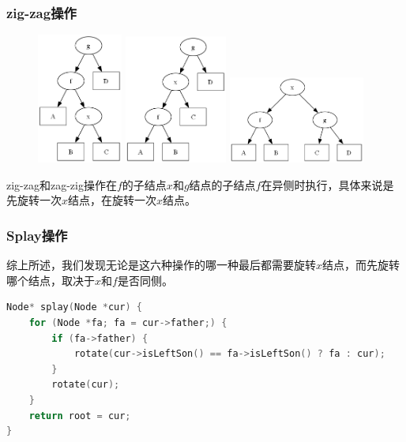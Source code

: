 \documentclass[utf8]{ctexbeamer}
\begin{document}
    \begin{frame}
        \frametitle{zig-zag操作}
        \begin{figure}
            \includegraphics[width=0.25\textwidth]{images/splay_zig-zag0.png}
            \includegraphics[width=0.3\textwidth]{images/splay_zig-zag1.png}
            \includegraphics[width=0.4\textwidth]{images/splay_zig-zag2.png}
        \end{figure}
        zig-zag和zag-zig操作在$f$的子结点$x$和$g$结点的子结点$f$在异侧时执行，具体来说是先旋转一次$x$结点，在旋转一次$x$结点。
    \end{frame}

    \begin{frame}[fragile]
        \frametitle{Splay操作}
        综上所述，我们发现无论是这六种操作的哪一种最后都需要旋转$x$结点，而先旋转哪个结点，取决于$x$和$f$是否同侧。
        \begin{lstlisting}[language=c++]
Node* splay(Node *cur) {
    for (Node *fa; fa = cur->father;) {
        if (fa->father) {
            rotate(cur->isLeftSon() == fa->isLeftSon() ? fa : cur);
        }
        rotate(cur);
    }
    return root = cur;
}       
        \end{lstlisting}
    \end{frame}
    
\end{document}
